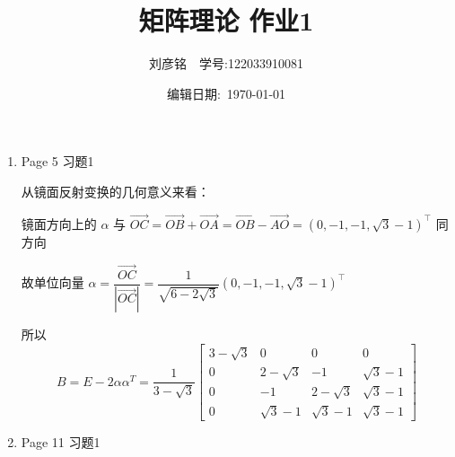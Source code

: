 \documentclass{article}
\title{矩阵理论 作业1}
\author{刘彦铭\ \ 学号:122033910081}
\date{编辑日期:\ \today}
\begin{document}
\maketitle

\begin{enumerate}
    \item Page 5 习题1
    
    从镜面反射变换的几何意义来看：
        \begin{figure}[htb]
            \centering 
        \end{figure}
    
    镜面方向上的 $\alpha$ 与 $\overrightarrow{OC} = \overrightarrow{OB} + \overrightarrow{OA} = \overrightarrow{OB} - \overrightarrow{AO} = (0, -1, -1, \sqrt3-1)^\top$ 同方向
    
    故单位向量 $\alpha=\dfrac{\overrightarrow{OC}}{|\overrightarrow{OC}|}=\dfrac{1}{\sqrt{6-2\sqrt3}}(0, -1, -1, \sqrt3 - 1)^\top$

    所以 
    $$B=E-2\alpha\alpha^T=\dfrac{1}{3 - \sqrt 3}\left[\begin{array}{cccc}
        3 - \sqrt 3 & 0 & 0 & 0 \\
        0 & 2 - \sqrt 3 & -1 & \sqrt 3 - 1 \\
        0 & -1 & 2 -\sqrt 3 & \sqrt 3 - 1 \\
        0 & \sqrt 3 - 1 & \sqrt 3 - 1 & \sqrt 3 - 1    
    \end{array}\right]$$

    \item Page 11 习题1 
    

\end{enumerate}
\end{document}
